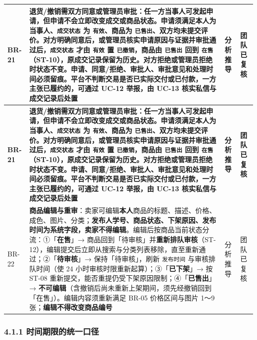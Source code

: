 \documentclass[12pt,a4paper]{ctexart}
\begin{document}
{\scriptsize
\begin{longtable}{|p{1.32cm}|p{12.03cm}|p{1.32cm}|p{1.32cm}|}
\hline
\textbf{BR-21} & \textbf{\textbf{退货/撤销需双方同意或管理员审批}：任一方当事人可发起申请，但申请不会立即改变成交或商品状态。申请须满足本人为当事人、\texttt{成交状态} 为 \texttt{有效}、商品为 \texttt{已售出}、双方均未提交评价。对方明确同意后，或管理员核实申请原因与证据并审批通过后，\texttt{成交状态} 才由 \texttt{有效} 置 \texttt{已撤销}，商品由 \texttt{已售出} 回到 \texttt{在售}（ST-10），原成交记录保留为历史。对方拒绝或管理员拒绝时状态不变。申请、同意/拒绝、审批人、审批意见和处理时间必须留痕。平台不判断交易是否已实际交付或已付款，一方主张已履约的，可通过 UC-12 举报，由 UC-13 核实私信与成交记录后处置} & \textbf{分析推导} & \textbf{团队已复核} \\
\hline
\endfirsthead
\hline
\textbf{BR-21} & \textbf{\textbf{退货/撤销需双方同意或管理员审批}：任一方当事人可发起申请，但申请不会立即改变成交或商品状态。申请须满足本人为当事人、\texttt{成交状态} 为 \texttt{有效}、商品为 \texttt{已售出}、双方均未提交评价。对方明确同意后，或管理员核实申请原因与证据并审批通过后，\texttt{成交状态} 才由 \texttt{有效} 置 \texttt{已撤销}，商品由 \texttt{已售出} 回到 \texttt{在售}（ST-10），原成交记录保留为历史。对方拒绝或管理员拒绝时状态不变。申请、同意/拒绝、审批人、审批意见和处理时间必须留痕。平台不判断交易是否已实际交付或已付款，一方主张已履约的，可通过 UC-12 举报，由 UC-13 核实私信与成交记录后处置} & \textbf{分析推导} & \textbf{团队已复核} \\
\hline
\endhead
\hline
\endfoot
BR-22 & \textbf{商品编辑与重审}：卖家可编辑\textbf{本人}商品的标题、描述、价格、成色、图片、分类；\textbf{发布人学号、商品状态、下架原因、发布时间为系统字段，卖家不得编辑}。编辑后按商品当前状态分流：①「\textbf{在售}」→ 商品回到「待审核」并\textbf{重新排队审核}（ST-12），编辑提交后立即从搜索与分类列表移除，直至重新通过；②「\textbf{待审核}」→ 保持「待审核」，刷新 \texttt{发布时间} 与审核排队时间（使 24 小时审核时限重新起算）；③「\textbf{已下架}」→ 按 ST-08 重新提交，能否重提仍受下架原因限制；④「\textbf{已售出}」→ \textbf{不可编辑}（含撤销后尚未重新上架期间，须先经撤销回到「在售」）。编辑内容须重新满足 BR-05 价格区间与图片 1～9 张；\textbf{编辑不得改变商品编号} & 分析推导 & 团队已复核 \\
\hline
\end{longtable}
}




\subsubsection*{4.1.1 时间期限的统一口径}
\end{document}
